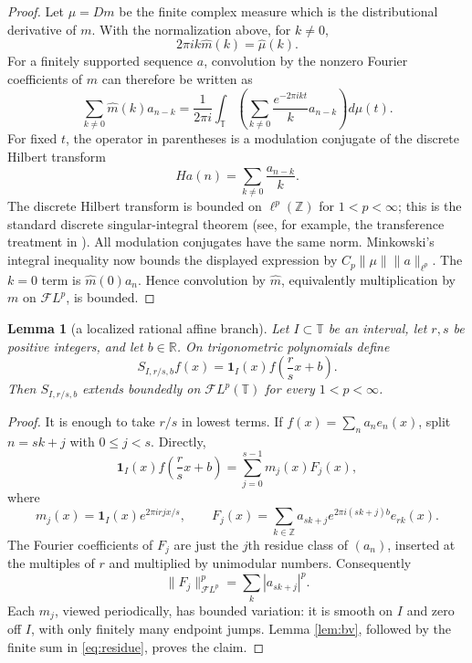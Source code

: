 \documentclass[11pt]{article}
\newtheorem{lemma}{Lemma}
\newcommand{\T}{\mathbb T}
\newcommand{\Z}{\mathbb Z}
\newcommand{\FL}{\mathcal F L}
\newcommand{\one}{\mathbf 1}
\begin{document}
\begin{proof}
Let $\mu=Dm$ be the finite complex measure which is the distributional
derivative of $m$.  With the normalization above, for $k\ne0$,
\[
  2\pi i k\widehat m(k)=\widehat\mu(k).
\]
For a finitely supported sequence $a$, convolution by the nonzero Fourier
coefficients of $m$ can therefore be written as
\[
 \sum_{k\ne0}\widehat m(k)a_{n-k}
 =\frac1{2\pi i}\int_\T
   \left(\sum_{k\ne0}\frac{e^{-2\pi i k t}}{k}a_{n-k}\right)d\mu(t).
\]
For fixed $t$, the operator in parentheses is a modulation conjugate of the
discrete Hilbert transform
\[
  Ha(n)=\sum_{k\ne0}\frac{a_{n-k}}{k}.
\]
The discrete Hilbert transform is bounded on $\ell^p(\Z)$ for
$1<p<\infty$; this is the standard discrete singular-integral theorem (see,
for example, the transference treatment in \cite{Grafakos}).  All modulation
conjugates have the same norm.  Minkowski's integral inequality now bounds
the displayed expression by
$C_p\|\mu\|\|a\|_{\ell^p}$.  The $k=0$ term is
$\widehat m(0)a_n$.  Hence convolution by $\widehat m$, equivalently
multiplication by $m$ on $\FL^p$, is bounded.
\end{proof}

\begin{lemma}[a localized rational affine branch]\label{lem:branch}
Let $I\subset\T$ be an interval, let $r,s$ be positive integers, and let
$b\in\mathbb R$.  On trigonometric polynomials define
\[
  S_{I,r/s,b}f(x)=\one_I(x)f\left(\frac rsx+b\right).
\]
Then $S_{I,r/s,b}$ extends boundedly on $\FL^p(\T)$ for every
$1<p<\infty$.
\end{lemma}

\begin{proof}
It is enough to take $r/s$ in lowest terms.  If
$f(x)=\sum_n a_ne_n(x)$, split $n=sk+j$ with $0\le j<s$.  Directly,
\begin{equation}\label{eq:residue}
 \one_I(x)f\left(\frac rsx+b\right)
 =\sum_{j=0}^{s-1}m_j(x)F_j(x),
\end{equation}
where
\[
 m_j(x)=\one_I(x)e^{2\pi i rjx/s},
 \qquad
 F_j(x)=\sum_{k\in\Z}a_{sk+j}e^{2\pi i(sk+j)b}e_{rk}(x).
\]
The Fourier coefficients of $F_j$ are just the $j$th residue class of
$(a_n)$, inserted at the multiples of $r$ and multiplied by unimodular
numbers.  Consequently
\[
 \|F_j\|_{\FL^p}^p=\sum_k|a_{sk+j}|^p.
\]
Each $m_j$, viewed periodically, has bounded variation: it is smooth on $I$
and zero off $I$, with only finitely many endpoint jumps.  Lemma
\ref{lem:bv}, followed by the finite sum in \eqref{eq:residue}, proves the
claim.
\end{proof}
\end{document}

